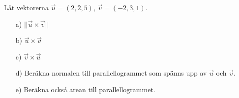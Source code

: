 Låt vektorerna $\vec{u} = (2,2,5)$, $\vec{v} = (-2,3,1)$.
\begin{itemize}
\item [a) ] $||\vec{u} \times \vec{v}||$  
\item [b) ] $\vec{u} \times \vec{v}$
\item [c) ] $\vec{v} \times \vec{u}$
\item [d) ] Beräkna normalen till parallellogrammet som spänns upp av $\vec{u}$ och $\vec{v}$.
\item [e) ] Beräkna också arean till parallellogrammet.
\end{itemize}